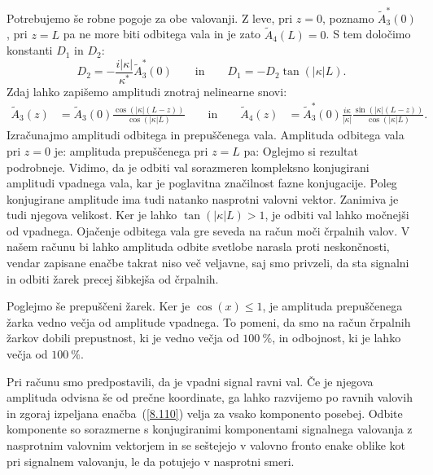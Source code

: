 Potrebujemo še robne pogoje za obe valovanji. Z leve, pri $z=0$,
poznamo $\tilde{A}_{3}^{*}\left(0\right)$, pri $z=L$ pa ne more biti odbitega
vala in je zato $\tilde{A}_{4}\left(L\right)=0$. S tem določimo konstanti $D_{1}$
in $D_{2}$:
\begin{equation}
D_2 = -\frac{i|\kappa|}{\kappa^*} \tilde{A}_3^*(0) \qquad
\textrm{in} \qquad 
D_1 = -D_2 \tan(|\kappa|L). 
\end{equation}
Zdaj lahko zapišemo amplitudi znotraj nelinearne snovi:
\begin{align}
\tilde{A}_{3}\left(z\right) & =  \tilde{A}_3(0)
\frac{\cos\left(|\kappa|(L-z)\right)}{\cos\left(|\kappa|L\right)}
\qquad \mathrm{in} \qquad
\tilde{A}_{4}\left(z\right) & =  \tilde{A}_3^*(0)\frac{i \kappa}{|\kappa|}
\frac{\sin\left(|\kappa|(L-z)\right)}{\cos\left(|\kappa|L\right)}.
\label{8.109}
\end{align}
Izračunajmo amplitudi odbitega in prepuščenega vala. Amplituda odbitega vala 
pri $z=0$ je:
amplituda prepuščenega pri $z = L$ pa:
Oglejmo si rezultat podrobneje. Vidimo, da je odbiti val sorazmeren 
kompleksno konjugirani amplitudi vpadnega vala, kar je poglavitna značilnost
fazne konjugacije. 
Poleg konjugirane amplitude ima tudi natanko nasprotni valovni vektor. 
Zanimiva je tudi njegova velikost. Ker 
je lahko $\tan\left(|\kappa|L\right)>1$, je odbiti val lahko močnejši od vpadnega.
Ojačenje odbitega vala gre seveda na račun moči črpalnih
valov. V našem računu bi lahko amplituda odbite svetlobe narasla proti neskončnosti, 
vendar zapisane enačbe takrat niso več veljavne, saj smo privzeli, 
da sta signalni in odbiti žarek precej šibkejša od črpalnih.

Poglejmo še prepuščeni žarek. Ker je $\cos(x)\leq1$, je amplituda prepuščenega
žarka vedno večja od amplitude vpadnega. To pomeni, da smo na račun črpalnih žarkov
dobili prepustnost, ki je vedno večja od $100~\%$, in odbojnost, ki je lahko 
večja od $100~\%$.

Pri računu smo predpostavili, da je vpadni signal ravni val. Če je njegova
amplituda odvisna še od prečne koordinate, ga lahko razvijemo po ravnih
valovih in zgoraj izpeljana enačba~(\ref{8.110}) velja za vsako komponento posebej. 
Odbite komponente so sorazmerne s konjugiranimi komponentami signalnega valovanja
z nasprotnim valovnim vektorjem in se seštejejo v valovno fronto enake
oblike kot pri signalnem valovanju, le da potujejo v nasprotni smeri.

